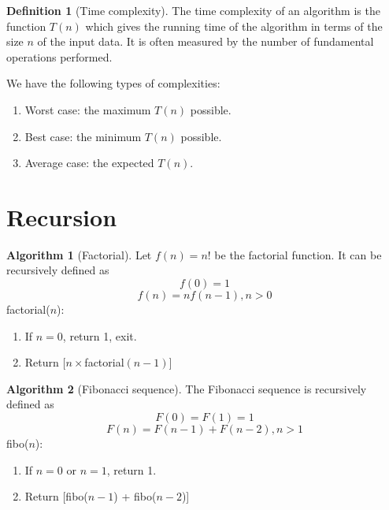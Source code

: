 \documentclass[10pt, a4paper]{extarticle}
\theoremstyle{definition}
\newtheorem{alg}{Algorithm}
\newtheorem{defn}{Definition}
\begin{document}
\begin{defn}[Time complexity]
	The time complexity of an algorithm is the function $T(n)$ which gives the running time of the algorithm in terms of the size $n$ of the input data. It is often measured by the number of fundamental operations performed.

	We have the following types of complexities:
	\begin{enumerate}
		\item Worst case: the maximum $T(n)$ possible.
		\item Best case: the minimum $T(n)$ possible.
		\item Average case: the expected $T(n)$.
	\end{enumerate}
\end{defn}

\section{Recursion}
\begin{alg}[Factorial]
	Let $f(n)=n!$ be the factorial function. It can be recursively defined as
	\[f(0)=1\]\[f(n)=nf(n-1), n>0\]
	factorial($n$):
	\begin{enumerate}
		\item If $n=0$, return 1, exit.
		\item Return $[n\times$factorial$(n-1)]$
	\end{enumerate}
\end{alg}
\begin{alg}[Fibonacci sequence]
	The Fibonacci sequence is recursively defined as
	\[F(0)=F(1)=1\]
	\[F(n)=F(n-1)+F(n-2),n>1\]
	fibo($n$):
	\begin{enumerate}
		\item If $n=0$ or $n=1$, return 1.
		\item Return [fibo($n-1$) + fibo($n-2$)]
	\end{enumerate}
\end{alg}
\end{document}
